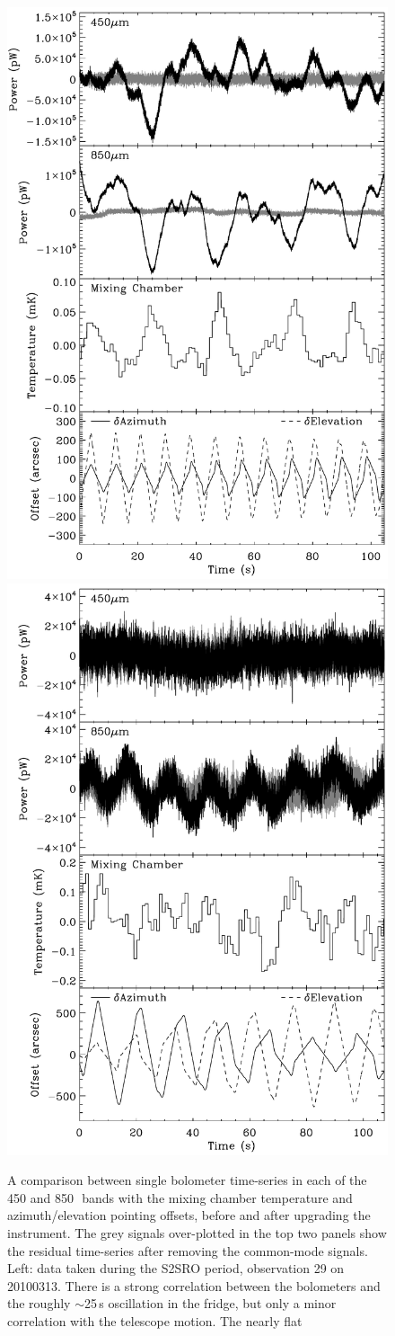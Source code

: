 \documentclass[useAMS,usenatbib,nofootinbib]{mn2e}
\begin{document}
\begin{figure}
\includegraphics[width=0.49\linewidth]{bolos_point_mix_s2sro.pdf}
\includegraphics[width=0.49\linewidth]{bolos_point_mix.pdf}
\caption{A comparison between single bolometer time-series in each of
  the 450 and 850\,\micron\ bands with the mixing chamber temperature
  and azimuth/elevation pointing offsets, before and after upgrading
  the instrument. The grey signals over-plotted in the top two panels
  show the residual time-series after removing the common-mode
  signals.  Left: data taken during the S2SRO period, observation 29
  on 20100313. There is a strong correlation between the bolometers
  and the roughly $\sim$25\,s oscillation in the fridge, but only a
  minor correlation with the telescope motion. The nearly flat
}
\end{figure}
\end{document}

